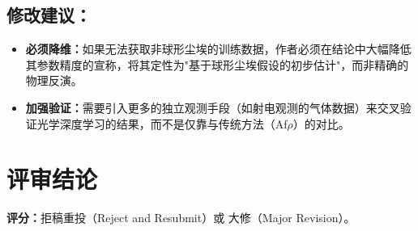 \documentclass[12pt]{article}
\begin{document}
\subsection{修改建议：}
\begin{itemize}
\item \textbf{必须降维：}如果无法获取非球形尘埃的训练数据，作者必须在结论中大幅降低其参数精度的宣称，将其定性为"基于球形尘埃假设的初步估计"，而非精确的物理反演。
\item \textbf{加强验证：}需要引入更多的独立观测手段（如射电观测的气体数据）来交叉验证光学深度学习的结果，而不是仅靠与传统方法（Af$\rho$）的对比。
\end{itemize}
\section{评审结论}
\textbf{评分：}拒稿重投（Reject and Resubmit）或 大修（Major Revision）。
\end{document}
